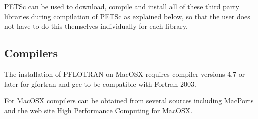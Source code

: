 PETSc can be used to download, compile and install all of these third party libraries during compilation of PETSc as explained below, so that the user does not have to do this themselves individually for each library.

\subsection{Compilers}

The installation of PFLOTRAN on MacOSX requires compiler versions 4.7 or later for gfortran and gcc to be compatible with Fortran 2003. 

For MacOSX compilers can be obtained from several sources including \href{http://www.macports.org/}{MacPorts} and the web site \href{http://hpc.sourceforge.net/}{High Performance Computing for MacOSX}.

\begin{comment}
\subsection{Mac OS X}

The installation of PFLOTRAN on MacOSX requires compiler versions 4.7.2 or later for gfortran and gcc and must be compatible with object oriented features in Fortran 2003. 

\subsubsection{OpenMPI}

\begin{verbatim}
setenv F90 gfortran
setenv F77 gfortran
setenv FC gfortran
setenv CC gcc-4
setenv CXX g++-4

./configure \
--prefix=$PKGS/openmpi/openmpi-1.4.1-gcc-4.4.2-gfortran \
--disable-debug \
--enable-static \
--disable-shared

make
make install
\end{verbatim}

\subsubsection{Hypre}

\begin{verbatim}
./configure \
--with-MPI \
--enable-debug \
--disable-opt \
--prefix=${HYPRE_INSTALL_DIR} \
--with-MPI-include=${MPI_HOME}/include \
--with-MPI-libs=openmpi \
--with-MPI-lib-dirs=${MPI_HOME}/lib \
CC=mpicc \
CXX=mpicxx \
F77=mpif90

make
make install
\end{verbatim}
\end{comment}


